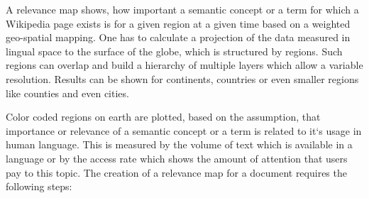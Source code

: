 \documentclass[a4paper,10pt]{scrbook}
\begin{document}

A relevance map shows, how important a semantic concept or a term for which a
Wikipedia page exists is for a given region at a given time based on a
weighted geo-spatial mapping. One has to calculate a projection of the data
measured in lingual space to the surface of the globe, which is structured by
regions. Such regions can overlap and build a hierarchy of multiple layers
which allow a variable resolution. Results can be shown for
continents, countries or even smaller regions like counties and even cities. 

Color coded regions on earth are plotted, based on the assumption, that
importance or relevance of a semantic concept or a term is related to it`s usage
in human language. This is measured by the volume of text which is available in
a language or by the access rate which shows the amount of attention that users
pay to this topic. The creation of a relevance map for a document
requires the following steps:
\end{document}
